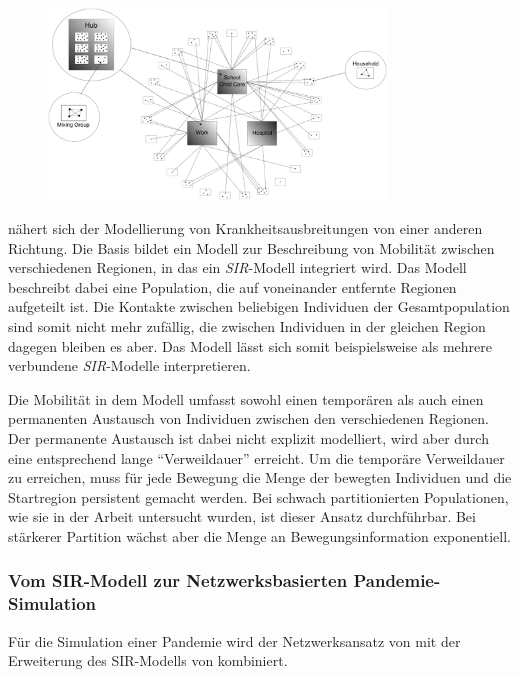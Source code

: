 \begin{figure}
\includegraphics[width=0.8\textwidth]{res/diagramme/milne2008}
\caption{\cite[Figure 1. Idealised household and hub contact network]{Milne2008}}\label{fig:ssec:multipop:milne}
\end{figure}

\cite{Sattenspiel1995} nähert sich der Modellierung von Krankheitsausbreitungen von einer anderen Richtung. Die Basis bildet ein Modell zur Beschreibung von Mobilität zwischen verschiedenen Regionen, in das ein \emph{SIR}-Modell integriert wird. Das Modell beschreibt dabei eine Population, die auf voneinander entfernte Regionen aufgeteilt ist. Die Kontakte zwischen beliebigen Individuen der Gesamtpopulation sind somit nicht mehr zufällig, die zwischen Individuen in der gleichen Region dagegen bleiben es aber. Das Modell lässt sich somit beispielsweise als mehrere verbundene \emph{SIR}-Modelle interpretieren.

Die Mobilität in dem Modell umfasst sowohl einen temporären als auch einen permanenten Austausch von Individuen zwischen den verschiedenen Regionen. Der permanente Austausch ist dabei nicht explizit modelliert, wird aber durch eine entsprechend lange ``Verweildauer'' erreicht. Um die temporäre Verweildauer zu erreichen, muss für jede Bewegung die Menge der bewegten Individuen und die Startregion persistent gemacht werden. Bei schwach partitionierten Populationen, wie sie in der Arbeit untersucht wurden, ist dieser Ansatz durchführbar. Bei stärkerer Partition wächst aber die Menge an Bewegungsinformation exponentiell.
\subsubsection{Vom SIR-Modell zur Netzwerksbasierten Pandemie-Simulation}
Für die Simulation einer Pandemie wird der Netzwerksansatz von \citep{Milne2008} mit der Erweiterung des SIR-Modells von \citep{Sattenspiel1995} kombiniert. 

